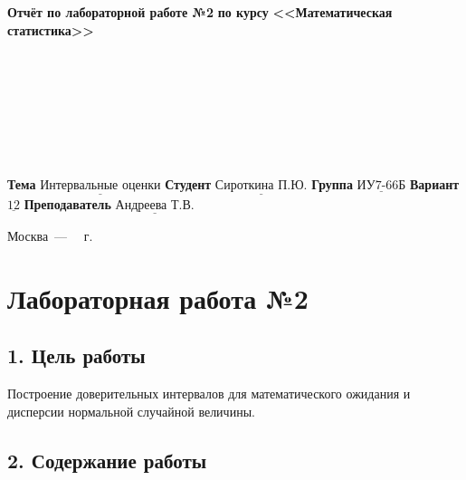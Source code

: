 \documentclass[12pt,a4paper]{scrreprt}
\begin{document}
\begin{titlepage}
	\begin{center}
		\noindent\begin{minipage}{1.3\textwidth}\centering
			\Large\textbf{Отчёт по лабораторной работе №2}\newline
			\textbf{по курсу}\newline
			\textbf{<<Математическая статистика>>}\newline
		\end{minipage}
	\end{center}
	
	~\\\\\\\\\\\\\\
	\normalsize
	\noindent\textbf{Тема } $\underline{\text{Интервальные оценки}}$\newline\newline
	\noindent\textbf{Студент } $\underline{\text{Сироткина П.Ю.}}$\newline\newline
	\noindent\textbf{Группа } $\underline{\text{ИУ7-66Б}}$\newline\newline
	\noindent\textbf{Вариант } $\underline{\text{12}}$\newline\newline
	\noindent\textbf{Преподаватель } $\underline{\text{Андреева Т.В.}}$\newline
	
	\begin{center}
		\vfill
		Москва~---~\the\year
		~г.
	\end{center}
\end{titlepage}

\chapter*{Лабораторная работа №2}

\section*{1. Цель работы}

Построение доверительных интервалов для математического ожидания и дисперсии нормальной случайной величины.

\section*{2. Содержание работы}
\end{document}
